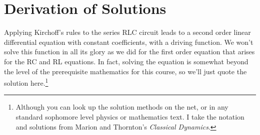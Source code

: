 \documentclass[12pt]{article}
\begin{document}
\appendix

\section{Derivation of Solutions}
\label{sec:solutions}

Applying Kirchoff's rules to the series RLC circuit leads to a second
order linear differential equation with constant coefficients, with a
driving function.  We won't solve this function in all its glory as we
did for the first order equation that arises for the RC and RL
equations.  In fact, solving the equation is somewhat beyond the level
of the prerequisite mathematics for this course, so we'll just quote
the solution here.\footnote{Although you can look up the solution
  methods on the net, or in any standard sophomore level physics or
  mathematics text.  I take the notation and solutions from Marion and
  Thornton's \textit{Classical Dynamics}.}
\end{document}
